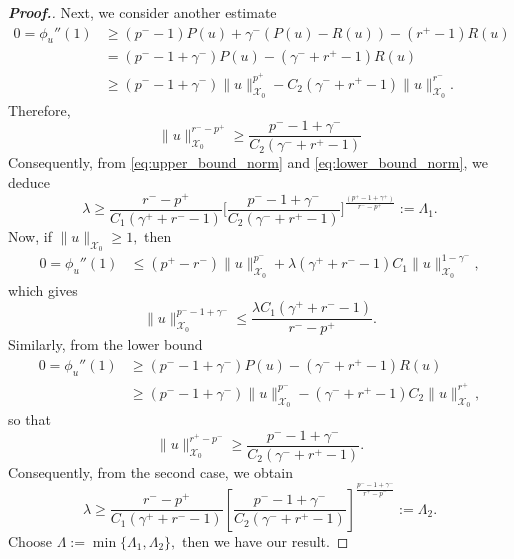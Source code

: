 \documentclass[11pt]{article}
\newcommand{\X}{\mathcal{X}_{0}}
\begin{document}
\begin{proof}[\bf Proof.]
 Next, we consider another estimate
\begin{align*}
0 = \phi_u''(1) &\geq (p^- - 1) P(u) 
+ \gamma^- (P(u) - R(u)) - (r^+ - 1) R(u) \\
&= (p^- - 1 + \gamma^-) P(u) - (\gamma^- 
+ r^+ - 1) R(u) \\
&\geq (p^- - 1 + \gamma^-) \|u\|_{\X}^{p^+} 
- C_2(\gamma^- + r^+ - 1) \|u\|_{\X}^{r^-}.
\end{align*}
Therefore,
\begin{equation} \label{eq:lower_bound_norm}
\|u\|_{\X}^{r^- - p^+} \geq 
\frac{p^- - 1 + \gamma^-}{C_2(\gamma^- + r^+ - 1)}
\end{equation}
Consequently, from 
\eqref{eq:upper_bound_norm} 
and \eqref{eq:lower_bound_norm}, 
we deduce
\begin{equation*} 
\lambda \geq 
\frac{r^- - p^+}{C_1 (\gamma^+ + r^- - 1)} 
\Big [ 
\frac{p^- - 1 + \gamma^-}{C_2 (\gamma^- + r^+ - 1)} 
\Big ]^{
\frac{(p^+ -1 + \gamma^+)}{r^- - p^+}} := \Lambda_1.
\end{equation*}
 Now, if $\|u\|_{\X} \geq 1,$
then
\begin{align*}
0 = \phi_u''(1) &\leq (p^+ - r^-) \|u\|_{\X}^{p^-} 
+ \lambda (\gamma^+ + r^- - 1) C_1 
\|u\|_{\X}^{1 - \gamma^{-}}, 
\end{align*}
which gives
\begin{equation*}
\|u\|_{\X}^{p^- - 1 + \gamma^-} \leq 
\frac{\lambda C_1 (\gamma^+ + r^- - 1)}{r^- - p^+}.
\end{equation*}
 Similarly, from the lower bound
\begin{align*}
0 = \phi_u''(1) &\geq (p^- - 1 + \gamma^-) 
P(u) - (\gamma^- + r^+ - 1) R(u) \\
&\geq (p^- - 1 + \gamma^-) \|u\|_{\X}^{p^-} 
- (\gamma^- + r^+ - 1) C_2\|u\|_{\X}^{r^+},
\end{align*}
so that
\begin{equation}\label{eq:lower_bound_nehari}
\|u\|_{\X}^{r^+ - p^-} \geq 
\frac{p^- - 1 + \gamma^-}{C_2(\gamma^- + r^+ - 1)}.
\end{equation} 
Consequently, from the second case, we obtain
\begin{equation*}
\lambda \geq 
\frac{r^- - p^+}{C_1(\gamma^+ + r^- - 1)} 
\left[ 
\frac{p^- - 1 + \gamma^-}
{C_2(\gamma^- + r^+ - 1)} \right]^{
\frac{p^- - 1 + \gamma^-}
{r^+ - p^-}} := \Lambda_2.
\end{equation*}
 Choose 
$
\Lambda := \min\{\Lambda_1, \Lambda_2\},
$
then we have our result.
\end{proof}
\end{document}
